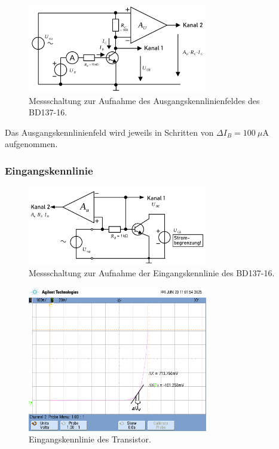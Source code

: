 \documentclass[
	a4paper, %
	12pt, %
]{CSUniSchoolLabReport}
\newcommand{\micro}{\ensuremath{\mu}}
\begin{document}
\begin{figure}[h]
	\centering
	\includegraphics[width=0.7\textwidth]{Figures/Messschaltung B.1.1..png}
	\caption{Messschaltung zur Aufnahme des Ausgangskennlinienfeldes des BD137-16.}
	\label{fig:Messschaltung B.1.1.}
\end{figure}

Das Ausgangskennlinienfeld wird jeweils in Schritten von $\Delta I_B = \SI{100}{\micro\ampere}$ aufgenommen.

\subsubsection{Eingangskennlinie}


\begin{figure}[h]
	\centering
	\includegraphics[width=0.7\textwidth]{Figures/Messschaltung B.1.2..png}
	\caption{Messschaltung zur Aufnahme der Eingangskennlinie des BD137-16.}
	\label{fig:Messschaltung B.1.2.}
\end{figure}
\begin{figure}[h]
	\centering
	\includegraphics[width=0.7\textwidth]{Figures/scope_5}
	\caption{Eingangskennlinie des Transistor.}
	\label{fig:Eingangskennlinie}
\end{figure}
\end{document}
